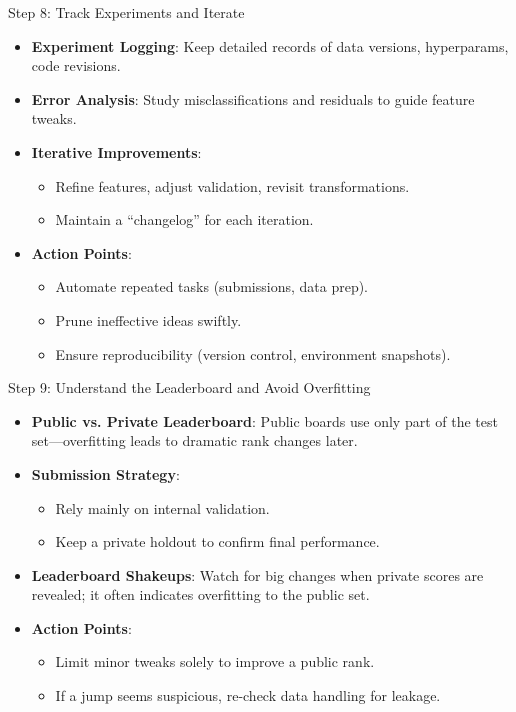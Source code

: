 \documentclass[ignorenonframetext,]{beamer}
\begin{document}
\begin{frame}{Step 8: Track Experiments and Iterate}
\begin{itemize}
  \item \textbf{Experiment Logging}: Keep detailed records of data versions, hyperparams, code revisions.
  \item \textbf{Error Analysis}: Study misclassifications and residuals to guide feature tweaks.
  \item \textbf{Iterative Improvements}:
    \begin{itemize}
      \item Refine features, adjust validation, revisit transformations.
      \item Maintain a “changelog” for each iteration.
    \end{itemize}
  \item \textbf{Action Points}:
    \begin{itemize}
      \item Automate repeated tasks (submissions, data prep).
      \item Prune ineffective ideas swiftly.
      \item Ensure reproducibility (version control, environment snapshots).
    \end{itemize}
\end{itemize}
\end{frame}

\begin{frame}{Step 9: Understand the Leaderboard and Avoid Overfitting}
\begin{itemize}
  \item \textbf{Public vs. Private Leaderboard}: Public boards use only part of the test set—overfitting leads to dramatic rank changes later.
  \item \textbf{Submission Strategy}:
    \begin{itemize}
      \item Rely mainly on internal validation.
      \item Keep a private holdout to confirm final performance.
    \end{itemize}
  \item \textbf{Leaderboard Shakeups}: Watch for big changes when private scores are revealed; it often indicates overfitting to the public set.
  \item \textbf{Action Points}:
    \begin{itemize}
      \item Limit minor tweaks solely to improve a public rank.
      \item If a jump seems suspicious, re-check data handling for leakage.
    \end{itemize}
\end{itemize}
\end{frame}
\end{document}
